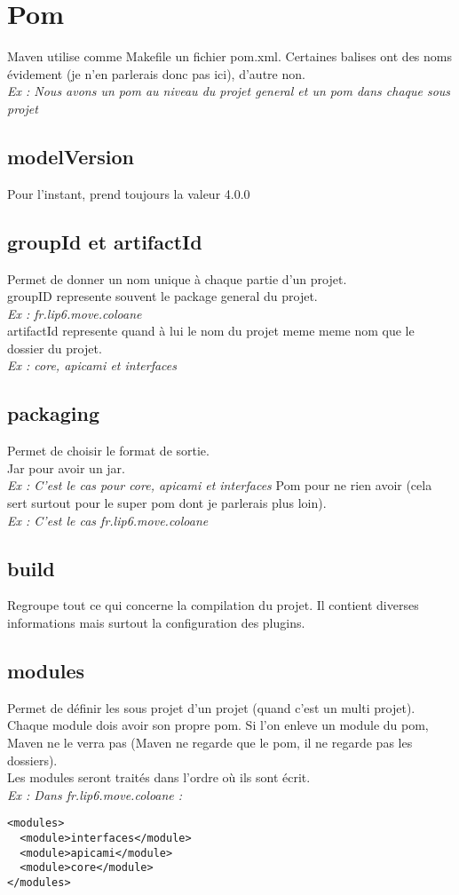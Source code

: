 \documentclass[a4paper,10pt]{article}
\begin{document}
\section{Pom}
Maven utilise comme Makefile un fichier pom.xml. Certaines balises ont des noms évidement (je n'en parlerais donc pas ici), d'autre non.\\
\textit{Ex : Nous avons un pom au niveau du projet general et un pom dans chaque sous projet}

\subsection{modelVersion}
Pour l'instant, prend toujours la valeur 4.0.0

\subsection{groupId et artifactId}
Permet de donner un nom unique à chaque partie d'un projet.\\
groupID represente souvent le package general du projet.\\
\textit{Ex : fr.lip6.move.coloane}\\
artifactId represente quand à lui le nom du projet meme meme nom que le dossier du projet.\\
\textit{Ex : core, apicami et interfaces}

\subsection{packaging}
Permet de choisir le format de sortie.\\
Jar pour avoir un jar.\\
\textit{Ex : C'est le cas pour core, apicami et interfaces}
Pom pour ne rien avoir (cela sert surtout pour le super pom dont je parlerais plus loin).\\
\textit{Ex : C'est le cas fr.lip6.move.coloane}

\subsection{build}
Regroupe tout ce qui concerne la compilation du projet. Il contient diverses informations mais surtout la configuration des plugins.

\subsection{modules}
Permet de définir les sous projet d'un projet (quand c'est un multi projet). Chaque module dois avoir son propre pom. Si l'on enleve un module du pom, Maven ne le verra pas (Maven ne regarde que le pom, il ne regarde pas les dossiers).\\
Les modules seront traités dans l'ordre où ils sont écrit.\\
\textit{Ex : Dans fr.lip6.move.coloane : }
\begin{verbatim}
<modules>
  <module>interfaces</module>
  <module>apicami</module>
  <module>core</module>
</modules>
\end{verbatim}
\end{document}
